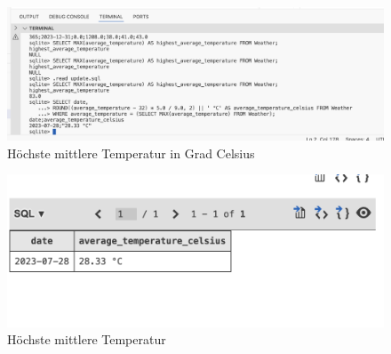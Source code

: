 \documentclass{article}
\begin{document}
\begin{figure} [h]
    \centering
    \includegraphics[width=1\linewidth]{Abfrage Temperatur.png}
    \caption{Höchste mittlere Temperatur in Grad Celsius}
    \label{fig:enter-label}
\end{figure}

\begin{figure}[h]
    \centering
    \includegraphics[width=0.5\linewidth]{Abfrage Bild.png}
    \caption{Höchste mittlere Temperatur}
    \label{fig:enter-label}
\end{figure}

\newpage


\end{document}
